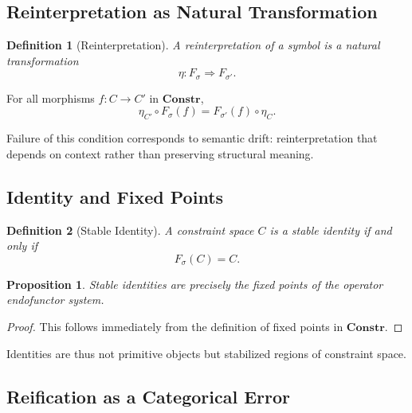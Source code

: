 \documentclass[11pt]{article}
\newtheorem{definition}{Definition}
\newtheorem{proposition}{Proposition}
\begin{document}
\subsection{Reinterpretation as Natural Transformation}

\begin{definition}[Reinterpretation]
A reinterpretation of a symbol is a natural transformation
\[
\eta : F_\sigma \Rightarrow F_{\sigma'}.
\]
\end{definition}

\begin{lemma}
For all morphisms $f : C \to C'$ in $\mathbf{Constr}$,
\[
\eta_{C'} \circ F_\sigma(f) = F_{\sigma'}(f) \circ \eta_C.
\]
\end{lemma}

Failure of this condition corresponds to semantic drift: reinterpretation that
depends on context rather than preserving structural meaning.

\subsection{Identity and Fixed Points}

\begin{definition}[Stable Identity]
A constraint space $C$ is a stable identity if and only if
\[
F_\sigma(C) = C.
\]
\end{definition}

\begin{proposition}
Stable identities are precisely the fixed points of the operator endofunctor
system.
\end{proposition}

\begin{proof}
This follows immediately from the definition of fixed points in
$\mathbf{Constr}$.
\end{proof}

Identities are thus not primitive objects but stabilized regions of constraint
space.

\subsection{Reification as a Categorical Error}
\end{document}
